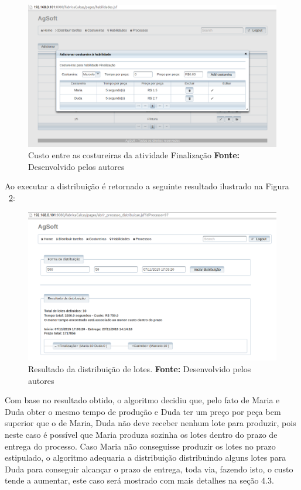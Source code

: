 \begin{figure}[h!]
	\centerline{\includegraphics[scale=0.4]{./imagens/custo_entre_costureiras_teste2.png}}
	\caption[Custo entre as costureiras atividade Finalização]
	{Custo entre as costureiras da atividade Finalização \textbf{Fonte:}
	Desenvolvido pelos autores}
	\label{fig:custo_entre_costureiras}
\end{figure}

\par Ao executar a distribuição é retornado a seguinte resultado ilustrado na Figura ~\ref{fig:resultado_custo}:

\newpage

\begin{figure}[h!]
	\centerline{\includegraphics[scale=0.4]{./imagens/resultado_teste2.png}}
	\caption[Resultado da distribuição de lotes.]
	{Resultado da distribuição de lotes. \textbf{Fonte:}
	Desenvolvido pelos autores}
	\label{fig:resultado_custo}
\end{figure}

\par Com base no resultado obtido, o algoritmo decidiu que, pelo fato de
Maria e Duda obter o mesmo tempo de produção e Duda ter um preço por peça
bem superior que o de Maria, Duda não deve receber nenhum lote para produzir, pois neste
caso é possível que Maria produza sozinha os lotes dentro do prazo de entrega do
processo. Caso Maria não conseguisse produzir os lotes no prazo estipulado, o
algoritmo adequaria a distribuição distribuindo alguns lotes para Duda para
conseguir alcançar o prazo de entrega, toda via, fazendo isto, o custo tende a
aumentar, este caso será mostrado com mais detalhes na seção 4.3.

